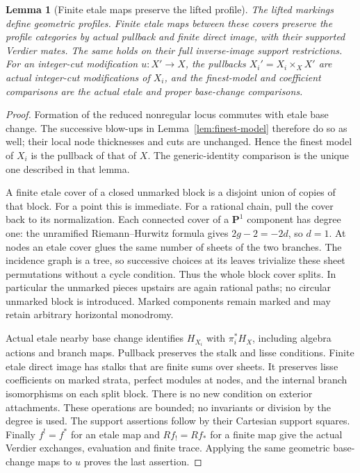 \documentclass[11pt]{article}
\newtheorem{lemma}[theorem]{Lemma}
\theoremstyle{definition}
\theoremstyle{remark}
\begin{document}
\begin{lemma}[Finite etale maps preserve the lifted profile]
\label{lem:etale-profile}
The lifted markings define geometric profiles. Finite etale maps
between these covers preserve the profile categories by actual
pullback and finite direct image, with their supported Verdier mates.
The same holds on their full inverse-image support restrictions.
For an integer-cut modification $u:X'\to X$, the pullbacks
$X_i'=X_i\times_X X'$ are actual integer-cut modifications of $X_i$,
and the finest-model and coefficient comparisons are the actual
etale and proper base-change comparisons.
\end{lemma}
\begin{proof}
Formation of the reduced nonregular locus commutes with etale base
change. The successive blow-ups in Lemma~\ref{lem:finest-model}
therefore do so as well; their local node thicknesses and cuts are
unchanged. Hence the finest model of $X_i$ is the pullback of that
of $X$. The generic-identity comparison is the unique one described
in that lemma.

A finite etale cover of a closed unmarked block is a disjoint union
of copies of that block. For a point this is immediate. For a rational
chain, pull the cover back to its normalization. Each connected cover
of a $\mathbf P^1$ component has degree one: the unramified
Riemann--Hurwitz formula gives $2g-2=-2d$, so $d=1$.
At nodes an etale cover glues the same number of sheets of the two
branches. The incidence graph is a tree, so successive choices at
its leaves trivialize these sheet permutations without a cycle
condition. Thus the whole block cover splits. In particular the
unmarked pieces upstairs are again rational paths; no circular
unmarked block is introduced. Marked components remain marked and
may retain arbitrary horizontal monodromy.

Actual etale nearby base change identifies $H_{X_i}$ with
$\pi_i^*H_X$, including algebra actions and branch maps. Pullback
preserves the stalk and lisse conditions. Finite etale direct image
has stalks that are finite sums over sheets. It preserves lisse
coefficients on marked strata, perfect modules at nodes, and the
internal branch isomorphisms on each split block. There is no new
condition on exterior attachments. These operations are bounded;
no invariants or division by the degree is used. The support
assertions follow by their Cartesian support squares. Finally
$f^!=f^*$ for an etale map and $Rf_!=Rf_*$ for a finite map give
the actual Verdier exchanges, evaluation and finite trace. Applying
the same geometric base-change maps to $u$ proves the last assertion.
\end{proof}
\end{document}
